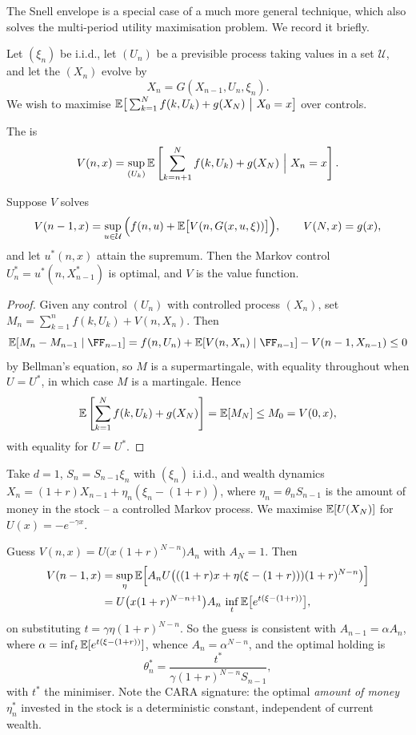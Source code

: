 \documentclass[a4paper]{scrartcl}
\begin{document}
The Snell envelope is a special case of a much more general technique, which also solves the multi-period utility maximisation problem. We record it briefly.

Let $(\xi_n)$ be i.i.d., let $(U_n)$ be a previsible  process taking values in a set $\mathcal{U}$, and let the  $(X_n)$ evolve by
$$
X_n = G(X_{n-1}, U_n, \xi_n).
$$
We wish to maximise $\mathbb{E}\big[\sum_{k=1}^N f(k,U_k) + g(X_N)\ \big|\ X_0 = x\big]$ over controls.

\begin{definition}
	The  is
	$$
	V(n,x) = \sup_{(U_k)}\mathbb{E}\left[\sum_{k=n+1}^N f(k,U_k) + g(X_N)\ \Big|\ X_n = x\right].
	$$
\end{definition}

\begin{theorem}[Bellman]\label{thm:bellman}
	Suppose $V$ solves 
	$$
	V(n-1,x) = \sup_{u\in\mathcal{U}}\Big(f(n,u) + \mathbb{E}\big[V(n, G(x,u,\xi))\big]\Big), \qquad V(N,x) = g(x),
	$$
	and let $u^*(n,x)$ attain the supremum. Then the Markov control $U_n^* = u^*(n,X^*_{n-1})$ is optimal, and $V$ is the value function.
\end{theorem}

\begin{proof}
	Given any control $(U_n)$ with controlled process $(X_n)$, set $M_n = \sum_{k=1}^n f(k,U_k) + V(n,X_n)$. Then
	$$
	\EE[M_n - M_{n-1}\mid\FF_{n-1}] = f(n,U_n) + \EE[V(n,X_n)\mid\FF_{n-1}] - V(n-1,X_{n-1}) \leq 0
	$$
	by Bellman's equation, so $M$ is a supermartingale, with equality throughout when $U = U^*$, in which case $M$ is a martingale. Hence
	$$
	\mathbb{E}\left[\sum_{k=1}^N f(k,U_k) + g(X_N)\right] = \mathbb{E}[M_N] \leq M_0 = V(0,x),
	$$
	with equality for $U = U^*$.
\end{proof}

\begin{example}
	Take $d=1$, $S_n = S_{n-1}\xi_n$ with $(\xi_n)$ i.i.d., and wealth dynamics $X_n = (1+r)X_{n-1} + \eta_n(\xi_n - (1+r))$, where $\eta_n = \theta_nS_{n-1}$ is the amount of money in the stock -- a controlled Markov process. We maximise $\mathbb{E}[U(X_N)]$ for $U(x) = -e^{-\gamma x}$.

	Guess $V(n,x) = U\big(x(1+r)^{N-n}\big)A_n$ with $A_N = 1$. Then
	\begin{align*}
		V(n-1,x) &= \sup_\eta \mathbb{E}\Big[A_nU\big(((1+r)x + \eta(\xi - (1+r)))(1+r)^{N-n}\big)\Big]\\
		&= U\big(x(1+r)^{N-n+1}\big)A_n\,\inf_{t}\mathbb{E}\big[e^{t(\xi - (1+r))}\big],
	\end{align*}
	on substituting $t = \gamma\eta(1+r)^{N-n}$. So the guess is consistent with $A_{n-1} = \alpha A_n$, where $\alpha = \inf_t\mathbb{E}[e^{t(\xi-(1+r))}]$, whence $A_n = \alpha^{N-n}$, and the optimal holding is
	$$
	\theta_n^* = \frac{t^*}{\gamma(1+r)^{N-n}S_{n-1}},
	$$
	with $t^*$ the minimiser. Note the CARA signature: the optimal \emph{amount of money} $\eta^*_n$ invested in the stock is a deterministic constant, independent of current wealth.
\end{example}
\end{document}
